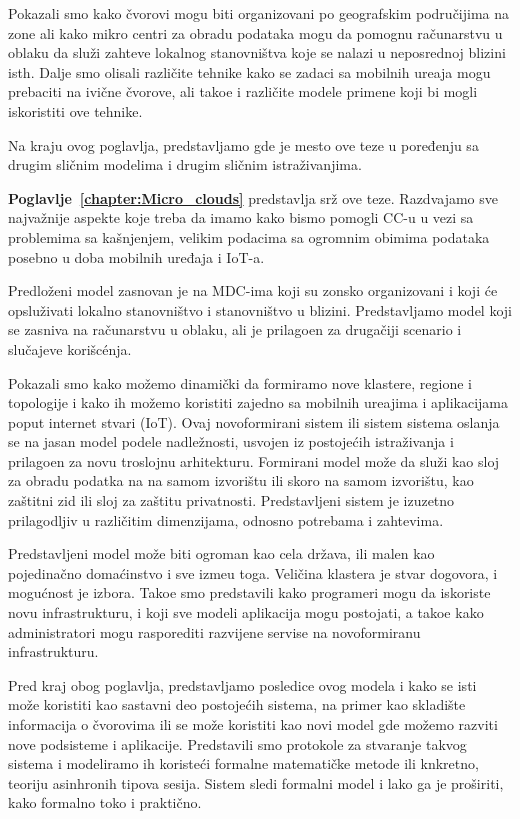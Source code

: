 Pokazali smo kako \v cvorovi mogu biti organizovani po geografskim podru\v cijima na zone ali kako mikro centri za obradu podataka mogu da pomognu ra\v cunarstvu u oblaku da slu\v zi zahteve lokalnog stanovni\v stva koje se nalazi u neposrednoj blizini isth. Dalje smo olisali razli\v cite tehnike kako se zadaci sa mobilnih ure\dj aja mogu prebaciti na ivi\v cne \v cvorove, ali tako\dj e i razli\v cite modele primene koji bi mogli iskoristiti ove tehnike.

Na kraju ovog poglavlja, predstavljamo gde je mesto ove teze u poređ\dj enju sa drugim sli\v cnim modelima i drugim sli\v cnim istra\v zivanjima.

\textbf{Poglavlje~\ref{chapter:Micro_clouds}} predstavlja sr\v z ove teze. Razdvajamo sve najvažnije aspekte koje treba da imamo kako bismo pomogli CC-u u vezi sa problemima sa kašnjenjem, velikim podacima sa ogromnim obimima podataka posebno u doba mobilnih uređaja i IoT-a.

Predlo\v zeni model zasnovan je na MDC-ima koji su zonsko organizovani i koji \'ce opslu\v zivati lokalno stanovni\v stvo i stanovni\v stvo u blizini. Predstavljamo model koji se zasniva na ra\v cunarstvu u oblaku, ali je prilago\dj en za druga\v ciji scenario i slu\v cajeve kori\v sc\'enja.

Pokazali smo kako mo\v zemo dinami\v cki da formiramo nove klastere, regione i topologije i kako ih možemo koristiti zajedno sa mobilnih ure\dj ajima i aplikacijama poput internet stvari (IoT). Ovaj novoformirani sistem ili sistem sistema oslanja se na jasan model podele nadle\v znosti, usvojen iz postojećih istra\v zivanja i prilago\dj en za novu troslojnu arhitekturu. Formirani model mo\v ze da slu\v zi kao sloj za obradu podatka na na samom izvori\v stu ili skoro na samom izvori\v stu, kao za\v stitni zid ili sloj za za\v stitu privatnosti. Predstavljeni sistem je izuzetno prilagodljiv u razli\v citim dimenzijama, odnosno potrebama i zahtevima.

Predstavljeni model mo\v ze biti ogroman kao cela dr\v zava, ili malen kao pojedina\v cno doma\'cinstvo i sve izme\dj u toga. Veli\v cina klastera je stvar dogovora, i mogu\'cnost je  izbora. Tako\dj e smo predstavili kako programeri mogu da iskoriste novu infrastrukturu, i koji sve modeli aplikacija mogu postojati, a tako\dj e kako administratori mogu rasporediti razvijene servise na novoformiranu infrastrukturu.

Pred kraj obog poglavlja, predstavljamo posledice ovog modela i kako se isti mo\v ze koristiti kao sastavni deo postoje\'cih sistema, na primer kao skladište informacija o \v cvorovima ili se mo\v ze koristiti kao novi model gde mo\v zemo razviti nove podsisteme i aplikacije. Predstavili smo protokole za stvaranje takvog sistema i modeliramo ih koriste\'ci formalne matemati\v cke metode ili knkretno, teoriju asinhronih tipova sesija. Sistem sledi formalni model i lako ga je pro\v siriti, kako formalno toko i prakti\v cno.

